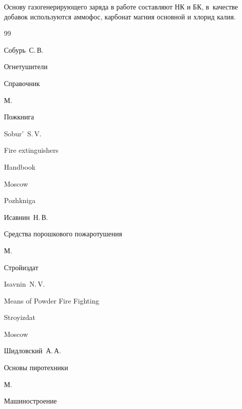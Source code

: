 Основу газогенерирующего заряда в работе \cite{altuhov:bib12} составляют НК и БК, в~качестве добавок используются аммофос, карбонат магния основной и хлорид калия.



\begin{thebibliography}{99}




\by Собурь~С.\,В.

\book Огнетушители

\bookinfo Справочник

\publaddr М.

\publ Пожкнига



\misctransl

\by Sobur'~S.\,V.

\book Fire extinguishers

\bookinfo Handbook

\publaddr Moscow

\publ Pozhkniga








\by Исавнин~Н.\,В.

\book Средства порошкового пожаротушения

\publaddr М.

\publ Стройиздат



\misctransl

\by Isavnin~N.\,V.

\book Means of Powder Fire Fighting 

\publ Stroyizdat

\publaddr Moscow 






\by Шидловский~А.\,А.

\book Основы пиротехники

\publaddr М.

\publ Машиностроение



\end{thebibliography}
